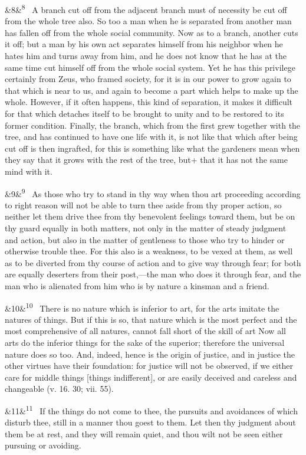 \documentclass[12pt]{article}
\newcommand{\para}[1][]{\par\noindent\ifx&#1&\else\textsuperscript{\footnotesize #1}~\fi}
\begin{document}
\para[8] A branch cut off from the adjacent branch must of necessity be cut
off from the whole tree also. So too a man when he is separated from
another man has fallen off from the whole social community. Now as to a
branch, another cuts it off; but a man by his own act separates himself
from his neighbor when he hates him and turns away from him, and he does
not know that he has at the same time cut himself off from the whole
social system. Yet he has this privilege certainly from Zeus, who framed
society, for it is in our power to grow again to that which is near to
us, and again to become a part which helps to make up the whole.
However, if it often happens, this kind of separation, it makes it
difficult for that which detaches itself to be brought to unity and to
be restored to its former condition. Finally, the branch, which from the
first grew together with the tree, and has continued to have one life
with it, is not like that which after being cut off is then ingrafted,
for this is something like what the gardeners mean when they say that it
grows with the rest of the tree, but+ that it has not the same mind with
it.

\para[9] As those who try to stand in thy way when thou art proceeding
according to right reason will not be able to turn thee aside from thy
proper action, so neither let them drive thee from thy benevolent
feelings toward them, but be on thy guard equally in both matters, not
only in the matter of steady judgment and action, but also in the matter
of gentleness to those who try to hinder or otherwise trouble thee. For
this also is a weakness, to be vexed at them, as well as to be diverted
from thy course of action and to give way through fear; for both are
equally deserters from their post,---the man who does it through fear,
and the man who is alienated from him who is by nature a kinsman and a
friend.

\para[10] There is no nature which is inferior to art, for the arts imitate
the natures of things. But if this is so, that nature which is the most
perfect and the most comprehensive of all natures, cannot fall short of
the skill of art Now all arts do the inferior things for the sake of
the superior; therefore the universal nature does so too. And, indeed,
hence is the origin of justice, and in justice the other virtues have
their foundation: for justice will not be observed, if we either care
for middle things [things indifferent], or are easily deceived and
careless and changeable (v. 16. 30; vii. 55).

\para[11] If the things do not come to thee, the pursuits and avoidances of
which disturb thee, still in a manner thou goest to them. Let then thy
judgment about them be at rest, and they will remain quiet, and thou
wilt not be seen either pursuing or avoiding.
\end{document}

